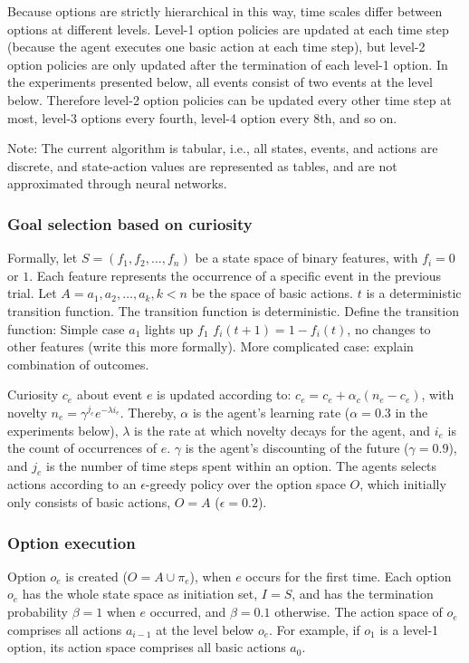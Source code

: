 \documentclass{article}
\begin{document}
Because options are strictly hierarchical in this way, time scales differ between options at different levels. Level-1 option policies are updated at each time step (because the agent executes one basic action at each time step), but level-2 option policies are only updated after the termination of each level-1 option. In the experiments presented below, all events consist of two events at the level below. Therefore level-2 option policies can be updated every other time step at most, level-3 options every fourth, level-4 option every 8th, and so on.

Note: The current algorithm is tabular, i.e., all states, events, and actions are discrete, and state-action values are represented as tables, and are not approximated through neural networks.

\subsubsection{Goal selection based on curiosity}

Formally, let $S = {(f_1, f_2, \ldots, f_n)}$ be a state space of binary features, with $f_i = 0$ or $1$. Each feature represents the occurrence of a specific event in the previous trial. Let $A = {a_1, a_2, \ldots, a_k}, k < n$ be the space of basic actions. $t$ is a deterministic transition function. The transition function is deterministic. Define the transition function: Simple case $a_1$ lights up $f_1$ $f_i(t+1)=1-f_i(t)$, no changes to other features (write this more formally). More complicated case: explain combination of outcomes.
	
Curiosity $c_e$ about event $e$ is updated according to: $c_e = c_e + \alpha_c (n_e - c_e)$, with novelty $n_e = \gamma^{j_e} e^{-\lambda i_e}$. Thereby, $\alpha$ is the agent's learning rate ($\alpha = 0.3$ in the experiments below), $\lambda$ is the rate at which novelty decays for the agent, and $i_e$ is the count of occurrences of $e$. $\gamma$ is the agent's discounting of the future ($\gamma = 0.9$), and $j_e$ is the number of time steps spent within an option. The agents selects actions according to an $\epsilon$-greedy policy over the option space $O$, which initially only consists of basic actions, $O = A$ ($\epsilon = 0.2$). 

\subsubsection{Option execution}

Option $o_e$ is created ($O = A \cup \pi_e$), when $e$ occurs for the first time. Each option $o_e$ has the whole state space as initiation set, $I = S$, and has the termination probability $\beta = 1$ when $e$ occurred, and $\beta = 0.1$ otherwise. The action space of $o_e$ comprises all actions $a_{i-1}$ at the level below $o_e$. For example, if $o_1$ is a level-1 option, its action space comprises all basic actions $a_0$. 
\end{document}
